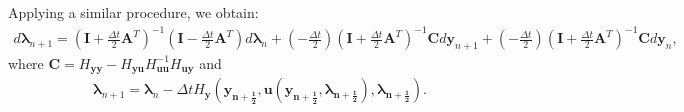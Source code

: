 \documentclass[a4paper, 10pt]{article}
\begin{document}
Applying a similar procedure, we obtain:
\begin{align}
   \boxed{d\bm{\lambda}_{n+1} = (\bm{I}+\tfrac{\Delta{t}}{2}\bm{A}^{T})^{-1}(\bm{I}-\tfrac{\Delta{t}}{2}\bm{A}^{T})d\bm{\lambda}_{n} + (-\tfrac{\Delta{t}}{2}) (\bm{I}+\tfrac{\Delta{t}}{2}\bm{A}^{T})^{-1}\bm{C}d\bm{y}_{n+1} +
      (-\tfrac{\Delta{t}}{2}) (\bm{I}+\tfrac{\Delta{t}}{2}\bm{A}^{T})^{-1}\bm{C}d\bm{y}_{n},} \label{m.m.p_eq_2}
\end{align}
where $\bm{C} = H_{\bm{yy}} - H_{\bm{yu}}H_{\bm{uu}}^{-1}H_{\bm{uy}}$ and
\begin{align*}
    \bm{\lambda}_{n+1} = \bm{\lambda}_{n} - \Delta{t}H_{\bm{y}}(\bm{y_{n+\frac{1}{2}}}, \bm{u}(\bm{y_{n+\frac{1}{2}}},\bm{\lambda_{n+\frac{1}{2}}}),\bm{\lambda_{n+\frac{1}{2}}}).
\end{align*}
\end{document}
